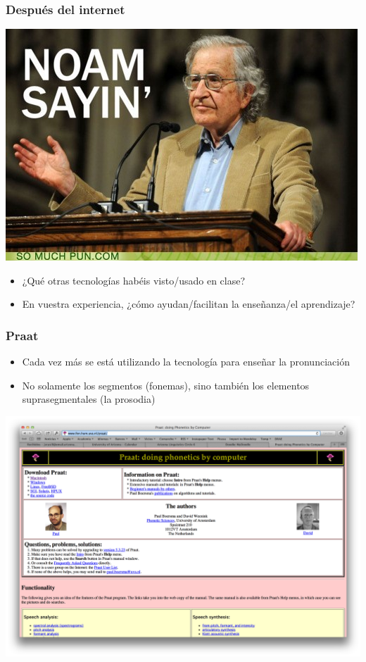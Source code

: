 \documentclass{beamer}
\begin{document}
\begin{frame}
	\frametitle{Después del internet}

	\begin{center}
		\includegraphics[width=.9\textwidth]{figures/memes3.jpeg}
	\end{center}
\end{frame}





\begin{frame}
	\begin{itemize}
		\item ¿Qué otras tecnologías habéis visto/usado en clase? 
		\item En vuestra experiencia, ¿cómo ayudan/facilitan la enseñanza/el aprendizaje?
	\end{itemize}
\end{frame}

\begin{frame}
	\frametitle{Praat}

	\begin{itemize}
		\item Cada vez más se está utilizando la tecnología para enseñar la pronunciación 
		\item No solamente los segmentos (fonemas), sino también los elementos suprasegmentales (la prosodia)
	\end{itemize}
\end{frame}

\begin{frame}[plain]
	\includegraphics[width=\textwidth]{figures/praat.png}	
\end{frame}
\end{document}
